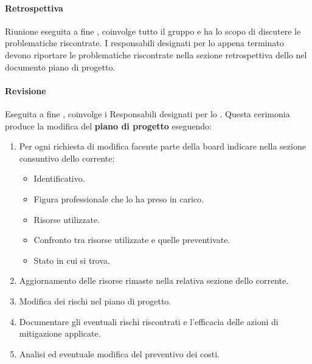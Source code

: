 \paragraph{Retrospettiva}
Riunione eseguita a fine , coinvolge tutto il gruppo e ha lo scopo di discutere le problematiche riscontrate.
I responsabili designati per lo  appena terminato devono riportare le problematiche riscontrate nella sezione retrospettiva dello  nel documento piano di progetto.


\paragraph{Revisione}
Eseguita a fine , coinvolge i Responsabili designati per lo .
Questa cerimonia produce la modifica del \textbf{piano di progetto} eseguendo:
\begin{enumerate}
    \item Per ogni richiesta di modifica facente parte della  board indicare nella sezione consuntivo dello  corrente:
    \begin{itemize}
        \item Identificativo.
        \item Figura professionale che lo ha preso in carico.
        \item Risorse utilizzate.
        \item Confronto tra risorse utilizzate e quelle preventivate.
        \item Stato in cui si trova.
    \end{itemize}
    \item Aggiornamento delle risorse rimaste nella relativa sezione dello  corrente.
    \item Modifica dei rischi nel piano di progetto.
    \item Documentare gli eventuali rischi riscontrati e l'efficacia delle azioni di mitigazione applicate.
    \item Analisi ed eventuale modifica del preventivo dei costi.
\end{enumerate}


